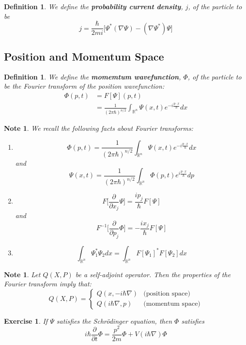 \documentclass[12pt]{amsart}
\newtheorem{defn}[thm]{Definition}
\newtheorem{note}[thm]{Note}
\newtheorem{ex}[thm]{Exercise}
\newcommand{\R}{\mathbb{R}}
\newcommand{\p}[1]{\frac{\partial}{\partial{#1}}}
\begin{document}
\begin{defn}
We define the \textbf{probability current density}, $j$, of the particle to be $$j = \frac{\hbar}{2mi} \bigg[ \Psi^* (\nabla \Psi) - (\nabla \Psi^*) \Psi\bigg]$$ 
\end{defn}
\subsection{Position and Momentum Space}
\begin{defn}
We define the \textbf{momemtum wavefunction}, $\Phi$, of the particle to be the Fourier transform of the position wavefunction: 
\begin{align*}
\Phi(p,t) 
&= F[\Psi](p,t)\\
&= \frac{1}{(2 \pi \hbar)^{n/2}} \int_{\R ^n}\Psi(x,t)e^{-i \frac{p \cdot x}{\hbar} }dx
\end{align*}
\end{defn}

\begin{note}
We recall the following facts about Fourier transforms:
\begin{enumerate}
\item $$\Phi(p,t) = \frac{1}{(2 \pi \hbar)^{n/2}} \int_{\R ^n}\Psi(x,t)e^{-i \frac{p \cdot x}{\hbar} }dx $$ and $$\Psi(x,t) = \frac{1}{(2 \pi \hbar)^{n/2}} \int_{\R ^n}\Phi(p,t)e^{i \frac{p \cdot x}{\hbar} }dp $$

\item $$F\bigg[\p{x_j} \Psi \bigg] = \frac{i p_j}{\hbar}F[\Psi]$$
and $$F^{-1}\bigg[\p{p_j} \Phi \bigg] = -\frac{i x_j}{\hbar}F[\Psi]$$

\item $$\int_{\R^n} \Psi_1^* \Psi_2 dx = \int_{\R^n} F[\Psi_1]^* F[\Psi_2]dx$$
\end{enumerate}
\end{note}

\begin{note}
Let $Q(X,P)$ be a self-adjoint operator. Then the properties of the Fourier transform imply that:
\[
Q(X,P)=
\begin{cases}
Q(x, -i\hbar \nabla) & \text{(position space)}\\
Q(i\hbar \nabla, p) & \text{(momentum space)}
\end{cases}
\]
\end{note}

\begin{ex}
If $\Psi$ satisfies the Schr\"{o}dinger equation, then $\Phi$ satisfies $$i\hbar \p{t}\Phi = \frac{p^2}{2m}\Phi + V(i \hbar \nabla)\Phi$$
\end{ex}
\end{document}
